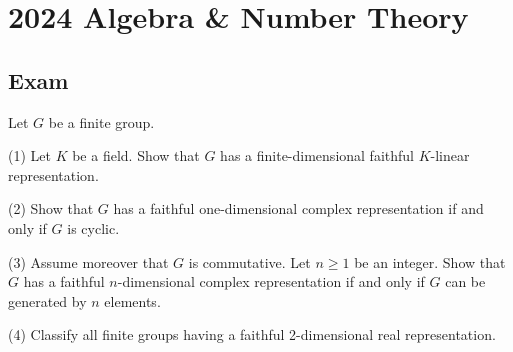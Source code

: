 \section{2024 Algebra \& Number Theory}

\subsection*{Exam}
\begin{exercise}
\label{algebra:2024:1}
Let $G$ be a finite group.

(1) Let $K$ be a field. Show that $G$ has a finite-dimensional faithful $K$-linear representation.

(2) Show that $G$ has a faithful one-dimensional complex representation if and only if $G$ is cyclic.

(3) Assume moreover that $G$ is commutative. Let $n \geq 1$ be an integer. Show that $G$ has a faithful $n$-dimensional complex representation if and only if $G$ can be generated by $n$ elements.

(4) Classify all finite groups having a faithful 2-dimensional real representation.
\end{exercise}

